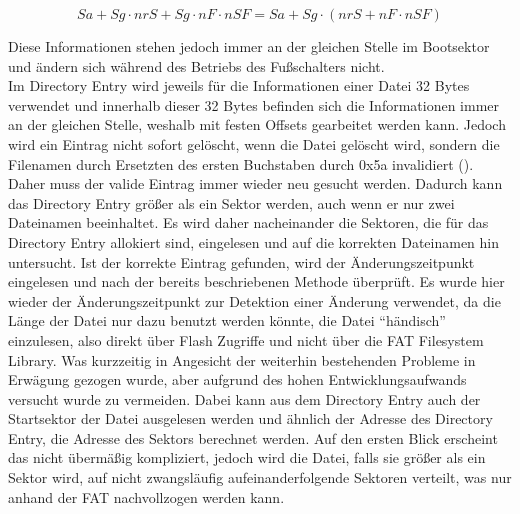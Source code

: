 \[Sa + Sg \cdot nrS + Sg \cdot nF \cdot nSF = Sa + Sg\cdot(nrS + nF \cdot nSF)\]

Diese Informationen stehen jedoch immer an der gleichen Stelle im Bootsektor und ändern sich während des Betriebs des Fußschalters nicht. \\
Im Directory Entry wird jeweils für die Informationen einer Datei 32 Bytes verwendet und innerhalb dieser 32 Bytes befinden sich die Informationen immer an der gleichen Stelle, weshalb mit festen Offsets gearbeitet werden kann. Jedoch wird ein Eintrag nicht sofort gelöscht, wenn die Datei gelöscht wird, sondern die Filenamen durch Ersetzten des ersten Buchstaben durch 0x5a invalidiert (\cite[Abschnitt 1.4]{FAT}). Daher muss der valide Eintrag immer wieder neu gesucht werden. Dadurch kann das Directory Entry größer als ein Sektor werden, auch wenn er nur zwei Dateinamen beeinhaltet. Es wird daher nacheinander die Sektoren, die für das Directory Entry allokiert sind, eingelesen und auf die korrekten Dateinamen hin untersucht. Ist der korrekte Eintrag gefunden, wird der Änderungszeitpunkt eingelesen und nach der bereits beschriebenen Methode überprüft. Es wurde hier wieder der Änderungszeitpunkt zur Detektion einer Änderung verwendet, da die Länge der Datei nur dazu benutzt werden könnte, die Datei ``händisch'' einzulesen, also direkt über Flash Zugriffe und nicht über die \ac{FAT} Filesystem Library. Was kurzzeitig in Angesicht der weiterhin bestehenden Probleme in Erwägung gezogen wurde, aber aufgrund des hohen Entwicklungsaufwands versucht wurde zu vermeiden. Dabei kann aus dem Directory Entry auch der Startsektor der Datei ausgelesen werden und ähnlich der Adresse des Directory Entry, die Adresse des Sektors berechnet werden. Auf den ersten Blick erscheint das nicht übermäßig kompliziert, jedoch wird die Datei, falls sie größer als ein Sektor wird, auf nicht zwangsläufig aufeinanderfolgende Sektoren verteilt, was nur anhand der \ac{FAT} nachvollzogen werden kann.

